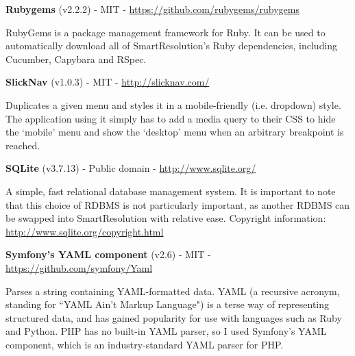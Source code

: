\textbf{Rubygems} (v2.2.2) - MIT - \url{https://github.com/rubygems/rubygems}

RubyGems is a package management framework for Ruby. It can be used to automatically download all of SmartResolution's Ruby dependencies, including Cucumber, Capybara and RSpec.

\textbf{SlickNav} (v1.0.3) - MIT - \url{http://slicknav.com/}

Duplicates a given menu and styles it in a mobile-friendly (i.e. dropdown) style. The application using it simply has to add a media query to their CSS to hide the `mobile' menu and show the `desktop' menu when an arbitrary breakpoint is reached.

\textbf{SQLite} (v3.7.13) - Public domain - \url{http://www.sqlite.org/}

A simple, fast relational database management system. It is important to note that this choice of RDBMS is not particularly important, as another RDBMS can be swapped into SmartResolution with relative ease. Copyright information: \url{http://www.sqlite.org/copyright.html}

\textbf{Symfony's YAML component} (v2.6) - MIT - \url{https://github.com/symfony/Yaml}

Parses a string containing YAML-formatted data. YAML (a recursive acronym, standing for ``YAML Ain't Markup Language") is a terse way of representing structured data, and has gained popularity for use with languages such as Ruby and Python. PHP has no built-in YAML parser, so I used Symfony's YAML component, which is an industry-standard YAML parser for PHP.